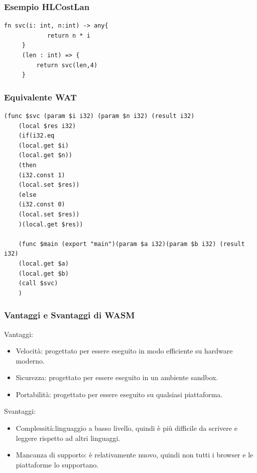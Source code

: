 \documentclass[xcolor=dvipsnames]{beamer}
\begin{document}
\begin{frame}[fragile]
    \frametitle{Esempio HLCostLan}
    \begin{lstlisting}[language=HLCostLan, caption={Esempio di funzione HLCostLan, Listing15}]
    fn svc(i: int, n:int) -> any{
            return n * i
     }
     (len : int) => {
         return svc(len,4)
     }
    \end{lstlisting}
\end{frame}
\begin{frame}[fragile]
    \frametitle{Equivalente WAT}
    \thispagestyle{empty}
        \begin{lstlisting}[language=WebAssembly]
    (func $svc (param $i i32) (param $n i32) (result i32)
    (local $res i32)
    (if(i32.eq
    (local.get $i)
    (local.get $n))
    (then
    (i32.const 1)
    (local.set $res))
    (else
    (i32.const 0)
    (local.set $res))
    )(local.get $res))

    (func $main (export "main")(param $a i32)(param $b i32) (result i32)
    (local.get $a)
    (local.get $b)
    (call $svc)
    )
        \end{lstlisting}
\end{frame}
\begin{frame}
    \frametitle{Vantaggi e Svantaggi di WASM}
    \begin{multicols}{2}
         \alert{Vantaggi}:
        \begin{itemize}
            \item \alert{Velocità}: progettato per essere eseguito in modo efficiente su hardware moderno.
            \item \alert{Sicurezza}: progettato per essere eseguito in un ambiente sandbox.
            \item \alert{Portabilità}: progettato per essere eseguito su qualsiasi piattaforma.
        \end{itemize}
        \columnbreak
        \alert{Svantaggi}:
        \begin{itemize}
            \item \alert{Complessità}:linguaggio a basso livello, quindi è più difficile da scrivere e leggere rispetto ad altri linguaggi.
            \item \alert{Mancanza di supporto}:  è relativamente nuovo, quindi non tutti i browser e le piattaforme lo supportano.
        \end{itemize}
        
    \end{multicols}
\end{frame}
\end{document}
